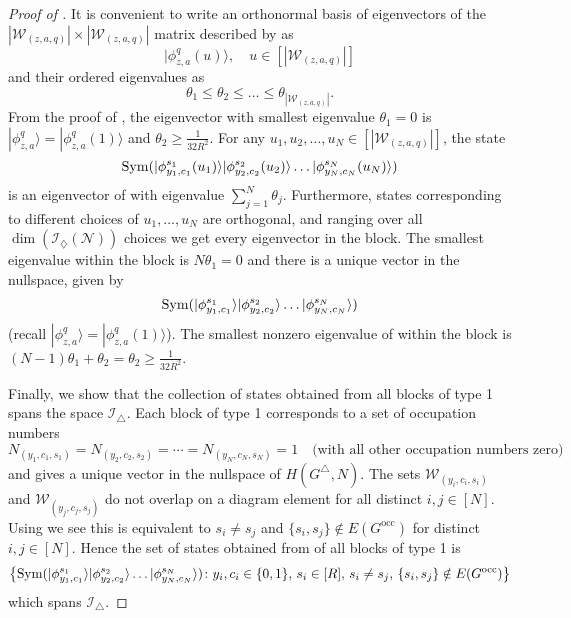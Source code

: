 \documentclass[../thesis-main/thesis-main]{subfiles}
\begin{document}
\begin{proof}[Proof of \protect{}]
It is convenient to write an orthonormal basis of eigenvectors of the $|\mathcal{W}_{(z,a,q)}|\times|\mathcal{W}_{(z,a,q)}|$ matrix described by  as 
\begin{equation}
|\phi_{z,a}^{q}(u)\rangle, \quad u\in[|\mathcal{W}_{(z,a,q)}|]\label{eq:phi_u}
\end{equation}
and their ordered eigenvalues as
\[
\theta_{1}\leq\theta_{2}\leq\ldots\leq\theta_{|\mathcal{W}_{(z,a,q)}|}.
\]
From the proof of , the eigenvector with smallest eigenvalue $\theta_{1}=0$ is $|\phi_{z,a}^{q}\rangle=|\phi_{z,a}^{q}(1)\rangle$ and $\theta_{2}\geq\frac{1}{32R^{2}}$. For any $u_{1},u_{2},\ldots,u_{N}\in [|\mathcal{W}_{(z,a,q)}|]$, the state 
\[
\operatorname{Sym}(|\phi_{y_{1},c_{1}}^{s_{1}}(u_{1})\rangle|\phi_{y_{2},c_{2}}^{s_{2}}(u_{2})\rangle\ldots|\phi_{y_{N},c_{N}}^{s_{N}}(u_{N})\rangle)
\]
is an eigenvector of  with eigenvalue $\sum_{j=1}^{N}\theta_{j}.$ Furthermore, states corresponding to different choices of $u_{1},\ldots,u_{N}$ are orthogonal, and ranging over all $\dim(\mathcal{I}_{\diamondsuit}(\mathcal{N}))$ choices we get every eigenvector in the block. The smallest eigenvalue within the block is $N\theta_{1}=0$ and there is a unique vector in the nullspace, given by
\begin{equation}
\operatorname{Sym}(|\phi_{y_{1},c_{1}}^{s_{1}}\rangle|\phi_{y_{2},c_{2}}^{s_{2}}\rangle\ldots|\phi_{y_{N},c_{N}}^{s_{N}}\rangle)\label{eq:vector_type1}
\end{equation}
(recall $|\phi_{z,a}^{q}\rangle=|\phi_{z,a}^{q}(1)\rangle$). The smallest nonzero eigenvalue of  within the block is $(N-1)\theta_{1}+\theta_{2}=\theta_{2}\geq\frac{1}{32R^{2}}$.

Finally, we show that the collection of states  obtained from all blocks of type 1 spans the space $\mathcal{I}_{\triangle}$. Each block of type 1 corresponds to a set of occupation numbers 
\[
N_{(y_{1},c_{1},s_{1})}=N_{(y_{2},c_{2},s_{2})}=\cdots=N_{(y_{N},c_{N},s_{N})}=1\quad\text{(with all other occupation numbers zero)}
\]
and gives a unique vector  in the nullspace of $H(G^{\triangle},N)$. The sets $\mathcal{W}_{(y_{i},c_{i},s_{i})}$ and $\mathcal{W}_{(y_{j},c_{j},s_{j})}$ do not overlap on a diagram element for all distinct $i,j\in[N]$. Using  we see this is equivalent to $s_{i}\neq s_{j}$ and $\{s_{i},s_{j}\}\notin E(G^{\text{occ}})$ for distinct $i,j\in[N]$. Hence the set of states  obtained from of all blocks of type 1 is 
\[
\left\{ \operatorname{Sym}(|\phi_{y_{1},c_{1}}^{s_{1}}\rangle|\phi_{y_{2},c_{2}}^{s_{2}}\rangle\ldots|\phi_{y_{N},c_{N}}^{s_{N}}\rangle)\colon y_{i},c_{i}\in\{0,1\},\, s_{i}\in[R],\, s_{i}\neq s_{j},\,\{s_{i},s_{j}\}\notin E(G^{\text{occ}})\right\} 
\]
which spans $\mathcal{I}_{\triangle}$.


\end{proof}
\end{document}
